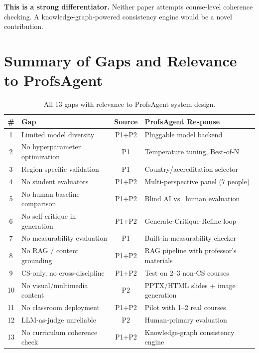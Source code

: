 \documentclass[11pt,a4paper]{article}
\begin{document}
\begin{greenbox}
\textbf{This is a strong differentiator.} Neither paper attempts course-level coherence checking. A knowledge-graph-powered consistency engine would be a novel contribution.
\end{greenbox}

\section{Summary of Gaps and Relevance to ProfsAgent}

\begin{table}[H]
\centering
\caption{All 13 gaps with relevance to ProfsAgent system design.}
\small
\begin{tabular}{@{}clcp{4.5cm}@{}}
\toprule
\textbf{\#} & \textbf{Gap} & \textbf{Source} & \textbf{ProfsAgent Response} \\
\midrule
1 & Limited model diversity & P1+P2 & Pluggable model backend \\
2 & No hyperparameter optimization & P1 & Temperature tuning, Best-of-N \\
3 & Region-specific validation & P1 & Country/accreditation selector \\
4 & No student evaluators & P1+P2 & Multi-perspective panel (7 people) \\
5 & No human baseline comparison & P1+P2 & Blind AI vs.\ human evaluation \\
6 & No self-critique in generation & P1+P2 & Generate-Critique-Refine loop \\
7 & No measurability evaluation & P1 & Built-in measurability checker \\
8 & No RAG / content grounding & P1+P2 & RAG pipeline with professor's materials \\
9 & CS-only, no cross-discipline & P1+P2 & Test on 2--3 non-CS courses \\
10 & No visual/multimedia content & P2 & PPTX/HTML slides + image generation \\
11 & No classroom deployment & P1+P2 & Pilot with 1--2 real courses \\
12 & LLM-as-judge unreliable & P2 & Human-primary evaluation \\
13 & No curriculum coherence check & P1+P2 & Knowledge-graph consistency engine \\
\bottomrule
\end{tabular}
\end{table}
\end{document}

